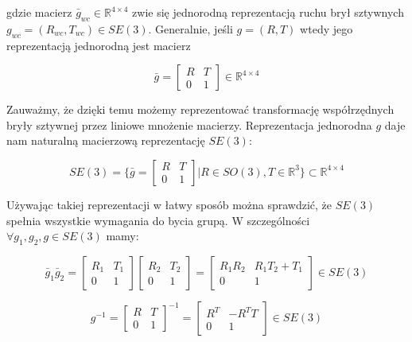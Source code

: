 \documentclass[a4paper,12pt]{article}
\newcommand{\RR}{\mathbb{R}^3}
\newcommand{\RRRq}{\mathbb{R}^{4 \times 4}}
\begin{document}
gdzie macierz $\bar{g}_{wc} \in \RRRq$ zwie się jednorodną reprezentacją ruchu brył sztywnych $g_{wc} = (R_{wc}, T_{wc}) \in SE(3)$. Generalnie, jeśli $g = (R,T)$ wtedy jego reprezentacją jednorodną jest macierz 

\begin{equation}
\bar{g} = \begin{bmatrix} R & T \\ 0 & 1 \end{bmatrix} \in \RRRq
\end{equation}

Zauważmy, że dzięki temu możemy reprezentować transformację współrzędnych bryły sztywnej przez liniowe mnożenie macierzy. Reprezentacja jednorodna $g$ daje nam naturalną macierzową reprezentację $SE(3)$:

\begin{equation}
SE(3) = \{ \bar{g} = \begin{bmatrix} R & T \\ 0 & 1 \end{bmatrix} | R \in SO(3), T \in \RR \} \subset \RRRq
\end{equation}

Używając takiej reprezentacji w łatwy sposób można sprawdzić, że $SE(3)$ spełnia wszystkie wymagania do bycia grupą. W szczególności $\forall g_1,g_2,g \in SE(3)$ mamy:

\begin{equation}
\bar{g}_1\bar{g}_2 = \begin{bmatrix} R_1 & T_1 \\ 0 & 1 \end{bmatrix}\begin{bmatrix} R_2 & T_2 \\ 0 & 1 \end{bmatrix}=\begin{bmatrix} R_1R_2 & R_1T_2+T_1 \\ 0 & 1 \end{bmatrix} \in SE(3)
\end{equation}

\begin{equation}
g^{-1}=\begin{bmatrix} R & T \\ 0 & 1 \end{bmatrix}^{-1}=\begin{bmatrix} R^T & -R^TT \\ 0 & 1 \end{bmatrix} \in SE(3)
\end{equation}
\end{document}
